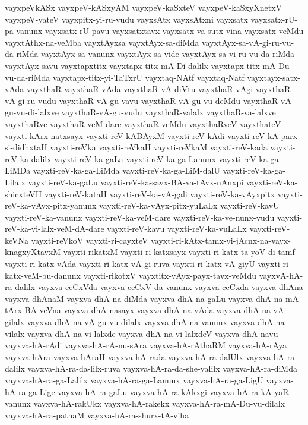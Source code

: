 {vayxpeVkASx
vayxpeV-kASxyAM
vayxpeV-kaSxteV
vayxpeV-kaSxyXnetxV
vayxpeV-yateV
vayxpitx-yi-ru-vudu
vayxsAtx
vayxsAtxni
vayxsatx
vayxsatx-rU-pa-vanunx
vayxsatx-rU-pavu
vayxsatxtavx
vayxsatx-va-sutx-vina
vayxsatx-veMdu
vayxtAthx-na-veMba
vayxtAyxsa
vayxtAyx-sa-diMda
vayxtAyx-sa-vA-gi-ru-vu-da-riMda
vayxtAyx-sa-vanunx
vayxtAyx-sa-vide
vayxtAyx-sa-vi-ru-vu-da-riMda
vayxtAyx-savu
vayxtapxtitx
vayxtapx-titx-mA-Di-dalilx
vayxtapx-titx-mA-Du-vu-da-riMda
vayxtapx-titx-yi-TaTxrU
vayxtaq-NAtf
vayxtaq-Natf
vayxtayx-satx-vAda
vayxthaR
vayxthaR-vAda
vayxthaR-vA-diVtu
vayxthaR-vAgi
vayxthaR-vA-gi-ru-vudu
vayxthaR-vA-gu-vavu
vayxthaR-vA-gu-vu-deMdu
vayxthaR-vA-gu-vu-di-lalxve
vayxthaR-vA-gu-vudu
vayxthaR-valalx
vayxthaR-va-lalxve
vayxthaRve
vayxthaR-veM-dare
vayxthaR-veMdu
vayxthaRveV
vayxthateV
vayxti-kArx-natxsayx
vayxti-reV-kABAyxM
vayxti-reV-kAdi
vayxti-reV-kA-parx-si-didhxtaH
vayxti-reVka
vayxti-reVkaH
vayxti-reVkaM
vayxti-reV-kada
vayxti-reV-ka-dalilx
vayxti-reV-ka-gaLa
vayxti-reV-ka-ga-Lanunx
vayxti-reV-ka-ga-LiMDa
vayxti-reV-ka-ga-LiMda
vayxti-reV-ka-ga-LiM-dalU
vayxti-reV-ka-ga-Lilalx
vayxti-reV-ka-gaLu
vayxti-reV-ka-savx-BA-va-tAvx-nAnxpi
vayxti-reV-ka-shicxteVH
vayxti-reV-kataH
vayxti-reV-ka-vA-gali
vayxti-reV-ka-vAyxpitx
vayxti-reV-ka-vAyx-pitx-yanunx
vayxti-reV-ka-vAyx-pitx-yuLaLx
vayxti-reV-kavU
vayxti-reV-ka-vanunx
vayxti-reV-ka-veM-dare
vayxti-reV-ka-ve-nunx-vudu
vayxti-reV-ka-vi-lalx-veM-dA-dare
vayxti-reV-kavu
vayxti-reV-ka-vuLaLx
vayxti-reV-keVNa
vayxti-reVkoV
vayxti-ri-cayxteV
vayxti-ri-kAtx-tamx-vi-jAcnx-na-vayx-knagxyXtavxM
vayxti-rikatxM
vayxti-ri-katxsayx
vayxti-ri-katx-ta-yoV-di-tamf
vayxti-ri-katx-vAda
vayxti-ri-katx-vA-gi-ruva
vayxti-ri-katx-vA-giyU
vayxti-ri-katx-veM-bu-danunx
vayxti-rikotxV
vayxtitx-vAyx-payx-tavx-veMdu
vayxvA-hA-ra-dalilx
vayxva-ceCxVda
vayxva-ceCxV-da-vanunx
vayxva-ceCxda
vayxva-dhAna
vayxva-dhAnaM
vayxva-dhA-na-diMda
vayxva-dhA-na-gaLu
vayxva-dhA-na-mA-tArx-BA-veVna
vayxva-dhA-nasayx
vayxva-dhA-na-vAda
vayxva-dhA-na-vA-gilalx
vayxva-dhA-na-vA-gu-vu-dilalx
vayxva-dhA-na-vanunx
vayxva-dhA-na-vilalx
vayxva-dhA-na-vi-lalxde
vayxva-dhA-na-vi-lalxdeV
vayxva-dhA-navu
vayxva-hA-rAdi
vayxva-hA-rA-nu-sAra
vayxva-hA-rAthaRM
vayxva-hA-rAya
vayxva-hAra
vayxva-hAraH
vayxva-hA-rada
vayxva-hA-ra-dalUlx
vayxva-hA-ra-dalilx
vayxva-hA-ra-da-lilx-ruva
vayxva-hA-ra-da-she-yalilx
vayxva-hA-ra-diMda
vayxva-hA-ra-ga-Lalilx
vayxva-hA-ra-ga-Lanunx
vayxva-hA-ra-ga-LigU
vayxva-hA-ra-ga-Lige
vayxva-hA-ra-gaLu
vayxva-hA-ra-kAkxgi
vayxva-hA-ra-kA-yaR-vanunx
vayxva-hA-rakUkx
vayxva-hA-rakekx
vayxva-hA-ra-mA-Du-vu-dilalx
vayxva-hA-ra-pathaM
vayxva-hA-ra-shurx-tA-viha
}
